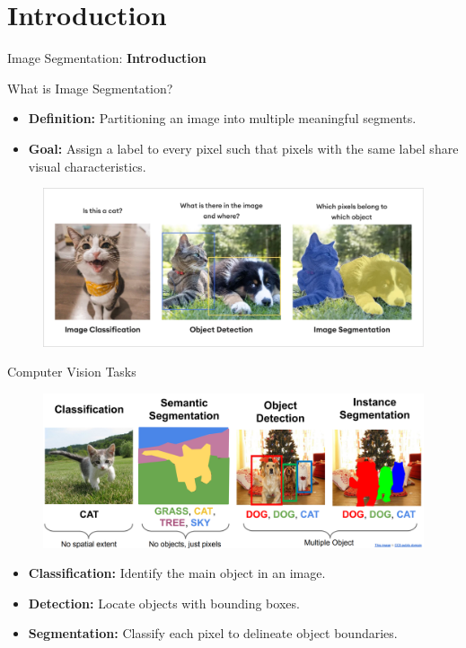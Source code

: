 \section{Introduction}
\begin{frame}{}
    \LARGE Image Segmentation: \textbf{Introduction}
\end{frame}

\begin{frame}{What is Image Segmentation?}
    \begin{itemize}
        \item \textbf{Definition:} Partitioning an image into multiple meaningful segments.
        \item \textbf{Goal:} Assign a label to every pixel such that pixels with the same label share visual characteristics.
    \end{itemize}
    \begin{figure}
        \centering
        \includegraphics[width=1.07\textwidth,height=0.6\textheight,keepaspectratio]{images/segmentation/segment-intro.png}
    \end{figure}
\end{frame}

\begin{frame}{Computer Vision Tasks}
    \begin{figure}
        \centering
        \includegraphics[width=1.0\textwidth,height=0.6\textheight,keepaspectratio]{images/segmentation/tasks.png}
    \end{figure}
    \begin{itemize}
        \item \textbf{Classification:} Identify the main object in an image.
        \item \textbf{Detection:} Locate objects with bounding boxes.
        \item \textbf{Segmentation:} Classify each pixel to delineate object boundaries.
    \end{itemize}
\end{frame}

